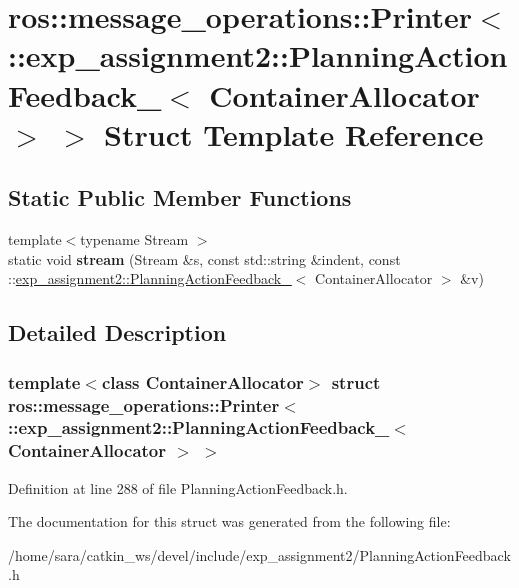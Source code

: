 \hypertarget{structros_1_1message__operations_1_1Printer_3_01_1_1exp__assignment2_1_1PlanningActionFeedback__b8653018509bc47142d9bd11267cb253}{}\section{ros\+:\+:message\+\_\+operations\+:\+:Printer$<$ \+:\+:exp\+\_\+assignment2\+:\+:Planning\+Action\+Feedback\+\_\+$<$ Container\+Allocator $>$ $>$ Struct Template Reference}
\label{structros_1_1message__operations_1_1Printer_3_01_1_1exp__assignment2_1_1PlanningActionFeedback__b8653018509bc47142d9bd11267cb253}
\subsection*{Static Public Member Functions}
\begin{DoxyCompactItemize}
\item 
\mbox{\label{structros_1_1message__operations_1_1Printer_3_01_1_1exp__assignment2_1_1PlanningActionFeedback__b8653018509bc47142d9bd11267cb253_a08ef56210629558cf2d9c9bebb53296d}} 
{\footnotesize template$<$typename Stream $>$ }\\static void {\bfseries stream} (Stream \&s, const std\+::string \&indent, const \+::\hyperlink{structexp__assignment2_1_1PlanningActionFeedback__}{exp\+\_\+assignment2\+::\+Planning\+Action\+Feedback\+\_\+}$<$ Container\+Allocator $>$ \&v)
\end{DoxyCompactItemize}


\subsection{Detailed Description}
\subsubsection*{template$<$class Container\+Allocator$>$\newline
struct ros\+::message\+\_\+operations\+::\+Printer$<$ \+::exp\+\_\+assignment2\+::\+Planning\+Action\+Feedback\+\_\+$<$ Container\+Allocator $>$ $>$}



Definition at line 288 of file Planning\+Action\+Feedback.\+h.



The documentation for this struct was generated from the following file\+:\begin{DoxyCompactItemize}
\item 
/home/sara/catkin\+\_\+ws/devel/include/exp\+\_\+assignment2/Planning\+Action\+Feedback.\+h\end{DoxyCompactItemize}
